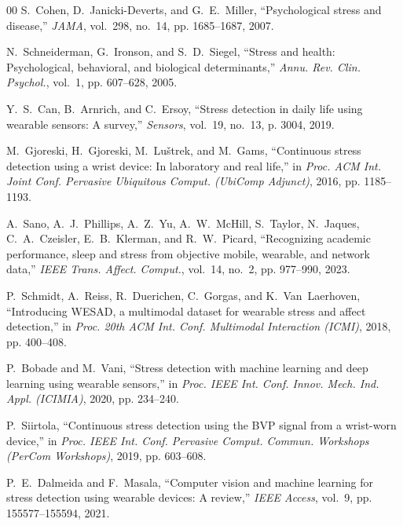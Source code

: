 \documentclass[conference]{IEEEtran}
\begin{document}
\begin{thebibliography}{00}
S.~Cohen, D.~Janicki-Deverts, and G.~E.~Miller, ``Psychological stress and disease,'' \textit{JAMA}, vol.~298, no.~14, pp. 1685--1687, 2007.

N.~Schneiderman, G.~Ironson, and S.~D.~Siegel, ``Stress and health: Psychological, behavioral, and biological determinants,'' \textit{Annu. Rev. Clin. Psychol.}, vol.~1, pp. 607--628, 2005.

Y.~S.~Can, B.~Arnrich, and C.~Ersoy, ``Stress detection in daily life using wearable sensors: A survey,'' \textit{Sensors}, vol.~19, no.~13, p. 3004, 2019.

M.~Gjoreski, H.~Gjoreski, M.~Lu\v{s}trek, and M.~Gams, ``Continuous stress detection using a wrist device: In laboratory and real life,'' in \textit{Proc. ACM Int. Joint Conf. Pervasive Ubiquitous Comput. (UbiComp Adjunct)}, 2016, pp. 1185--1193.

A.~Sano, A.~J.~Phillips, A.~Z.~Yu, A.~W.~McHill, S.~Taylor, N.~Jaques, C.~A.~Czeisler, E.~B.~Klerman, and R.~W.~Picard, ``Recognizing academic performance, sleep and stress from objective mobile, wearable, and network data,'' \textit{IEEE Trans. Affect. Comput.}, vol.~14, no.~2, pp. 977--990, 2023.

P.~Schmidt, A.~Reiss, R.~Duerichen, C.~Gorgas, and K.~Van~Laerhoven, ``Introducing WESAD, a multimodal dataset for wearable stress and affect detection,'' in \textit{Proc. 20th ACM Int. Conf. Multimodal Interaction (ICMI)}, 2018, pp. 400--408.

P.~Bobade and M.~Vani, ``Stress detection with machine learning and deep learning using wearable sensors,'' in \textit{Proc. IEEE Int. Conf. Innov. Mech. Ind. Appl. (ICIMIA)}, 2020, pp. 234--240.

P.~Siirtola, ``Continuous stress detection using the BVP signal from a wrist-worn device,'' in \textit{Proc. IEEE Int. Conf. Pervasive Comput. Commun. Workshops (PerCom Workshops)}, 2019, pp. 603--608.

P.~E.~Dalmeida and F.~Masala, ``Computer vision and machine learning for stress detection using wearable devices: A review,'' \textit{IEEE Access}, vol.~9, pp. 155577--155594, 2021.


\end{thebibliography}
\end{document}

